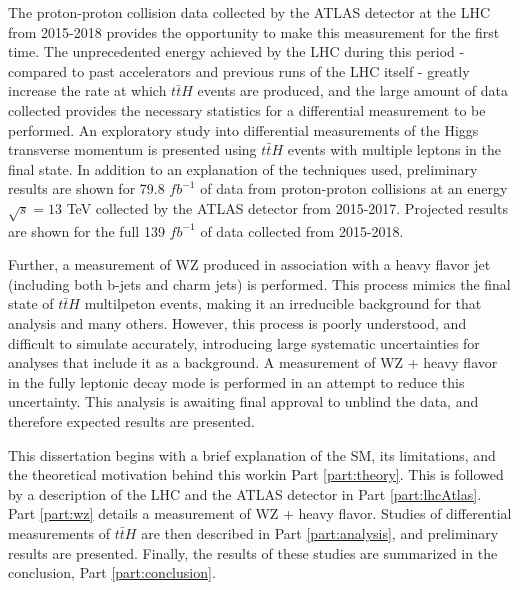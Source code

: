 The proton-proton collision data collected by the ATLAS detector at the LHC from 2015-2018 provides the opportunity to make this measurement for the first time. The unprecedented energy achieved by the LHC during this period - compared to past accelerators and previous runs of the LHC itself - greatly increase the rate at which $t\bar{t}H$ events are produced, and the large amount of data collected provides the necessary statistics for a differential measurement to be performed. An exploratory study into differential measurements of the Higgs transverse momentum is presented using $t\bar{t}H$ events with multiple leptons in the final state. In addition to an explanation of the techniques used, preliminary results are shown for 79.8 $fb^{-1}$ of data from proton-proton collisions at an energy $\sqrt{s} = 13$ TeV collected by the ATLAS detector from 2015-2017. Projected results are shown for the full 139 $fb^{-1}$ of data collected from 2015-2018. 

Further, a measurement of WZ produced in association with a heavy flavor jet (including both b-jets and charm jets) is performed. This process mimics the final state of $t\bar{t}H$ multilpeton events, making it an irreducible background for that analysis and many others. However, this process is poorly understood, and difficult to simulate accurately, introducing large systematic uncertainties for analyses that include it as a background. A measurement of WZ + heavy flavor in the fully leptonic decay mode is performed in an attempt to reduce this uncertainty. This analysis is awaiting final approval to unblind the data, and therefore expected results are presented.

This dissertation begins with a brief explanation of the SM, its limitations, and the theoretical motivation behind this workin Part \ref{part:theory}. This is followed by a description of the LHC and the ATLAS detector in Part \ref{part:lhcAtlas}. Part \ref{part:wz} details a measurement of WZ + heavy flavor. Studies of differential measurements of $t\bar{t}H$ are then described in Part \ref{part:analysis}, and preliminary results are presented. Finally, the results of these studies are summarized in the conclusion, Part \ref{part:conclusion}.

